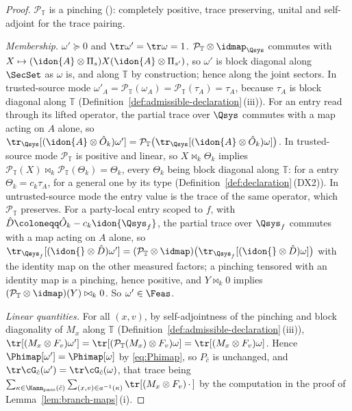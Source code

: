 \begin{proof}
$\mathcal{P}_{\mathbb{T}}$ is a pinching ():
completely positive, trace preserving, unital and self-adjoint for the trace
pairing.

\emph{Membership.} $\omega'\succeq0$ and $\tr\omega'=\tr\omega=1$.
$\mathcal{P}_{\mathbb{T}}\otimes\idmap_{\Qsys}$ commutes with
$X\mapsto(\idon{A}\otimes\Pi_s)X(\idon{A}\otimes\Pi_{s'})$, so $\omega'$ is
block diagonal along $\SecSet$ as $\omega$ is, and along $\mathbb{T}$ by
construction; hence along the joint sectors. In trusted-source mode
$\omega'_A=\mathcal{P}_{\mathbb{T}}(\omega_A)=\mathcal{P}_{\mathbb{T}}(\tau_A)
=\tau_A$, because $\tau_A$ is block diagonal along $\mathbb{T}$
(Definition~\ref{def:admissible-declaration}\,(iii)). For an entry read through its lifted
operator, the partial trace over $\Qsys$ commutes with a map acting on $A$
alone, so
$\tr_{\Qsys}[(\idon{A}\otimes\hat O_k)\omega']
=\mathcal{P}_{\mathbb{T}}\big(\tr_{\Qsys}[(\idon{A}\otimes\hat O_k)\omega]\big)$.
In trusted-source mode $\mathcal{P}_{\mathbb{T}}$ is positive and linear, so
$X\bowtie_k\Theta_k$ implies
$\mathcal{P}_{\mathbb{T}}(X)\bowtie_k\mathcal{P}_{\mathbb{T}}(\Theta_k)
=\Theta_k$, every $\Theta_k$ being block diagonal along $\mathbb{T}$: for a
 entry $\Theta_k=c_k\tau_A$, for a general one by
its type (Definition~\ref{def:declaration}\,(DX2)). In untrusted-source mode
the entry value is the trace of the same operator, which
$\mathcal{P}_{\mathbb{T}}$ preserves. For a party-local entry
scoped to $f$, with $\hat D\coloneqq\hat O_k-c_k\idon{\Qsys_f}$, the partial
trace over $\Qsys_f$ commutes with a map acting on $A$ alone, so
$\tr_{\Qsys_f}[(\idon{}\otimes\hat D)\omega']
=(\mathcal{P}_{\mathbb{T}}\otimes\idmap)\big(
\tr_{\Qsys_f}[(\idon{}\otimes\hat D)\omega]\big)$ with the identity map on
the other measured factors; a pinching tensored with an identity map is a
pinching, hence positive, and $Y\bowtie_k0$ implies
$(\mathcal{P}_{\mathbb{T}}\otimes\idmap)(Y)\bowtie_k0$. So
$\omega'\in\Feas$.

\emph{Linear quantities.} For all $(x,v)$, by self-adjointness of the
pinching and block diagonality of $M_x$ along $\mathbb{T}$
(Definition~\ref{def:admissible-declaration}\,(iii)),
$\tr[(M_x\otimes F_v)\omega']
=\tr[(\mathcal{P}_{\mathbb{T}}(M_x)\otimes F_v)\omega]
=\tr[(M_x\otimes F_v)\omega]$. Hence $\Phimap[\omega']=\Phimap[\omega]$ by
\eqref{eq:Phimap}, so $P_{\hat c}$ is unchanged, and
$\tr\cG_{\hat c}(\omega')=\tr\cG_{\hat c}(\omega)$, that trace being
$\sum_{\kappa\in\Kann_{\mathrm{pass}}(\hat c)}\sum_{(x,v)\in a^{-1}(\kappa)}
\tr[(M_x\otimes F_v)\,\cdot\,]$ by the computation in the proof of
Lemma~\ref{lem:branch-maps}\,(i).


\end{proof}
